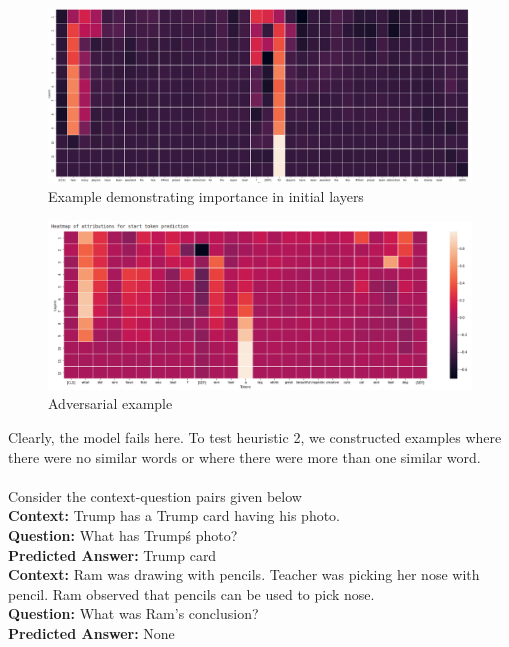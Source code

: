 \documentclass[10pt,twocolumn,letterpaper]{article}
\begin{document}
\newpage
\onecolumn
\begin{figure}
    \onecolumn\centering\includegraphics[scale=0.3]{obs1.png}
    \caption{Example demonstrating importance in initial layers}
    \label{ex1}
\end{figure}
\begin{figure}
    \centering
    \includegraphics[scale=0.38]{Screenshot from 2022-05-02 20-32-03.png}
    \caption{Adversarial example}
    \label{obs2}
\end{figure}
\twocolumn
Clearly, the model fails here. To test heuristic 2, we constructed examples where there were no similar words or where there were more than one similar word.
\\\\Consider the context-question pairs given below \\
\textbf{Context: }Trump has a Trump card having his photo.\\
\textbf{Question: }What has Trump\'s photo?\\
\textbf{Predicted Answer: }Trump card\\
\textbf{Context: }Ram was drawing with pencils. Teacher was picking her nose with pencil. Ram observed that pencils can be used to pick nose.\\
\textbf{Question: }What was Ram's conclusion?\\
\textbf{Predicted Answer: }None\\
\end{document}

